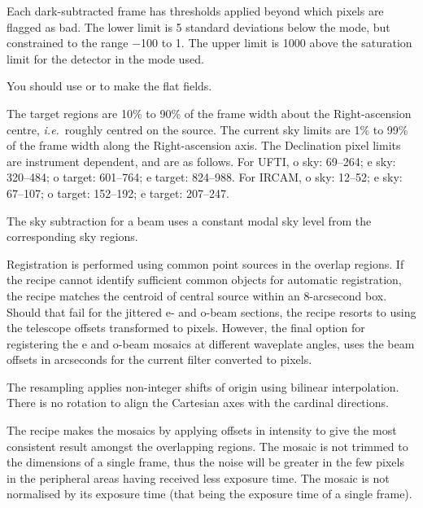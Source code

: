 \documentclass[twoside,11pt,nolof]{starlink}
\begin{document}
{{{         \sstitem
         Each dark-subtracted frame has thresholds applied beyond which
         pixels are flagged as bad.  The lower limit is 5 standard
         deviations below the mode, but constrained to the range $-$100 to 1.
         The upper limit is 1000 above the saturation limit for the detector
         in the mode used.

         \sstitem
         You should use  or
          to make the
         flat fields.

         \sstitem
         The target regions are 10\% to 90\% of the frame width about
         the Right-ascension centre, \emph{{i.e.}}\ roughly centred on the source.
         The current sky limits are 1\% to 99\% of the frame width along the
         Right-ascension axis.  The Declination pixel limits are instrument
         dependent, and are as follows.  For UFTI, o sky: 69--264;
         e sky: 320--484; o target: 601--764; e target: 824--988.  For
         IRCAM, o sky: 12--52; e sky: 67--107; o target: 152--192;
         e target: 207--247.

         \sstitem
         The sky subtraction for a beam uses a constant modal sky level
         from the corresponding sky regions.

         \sstitem
         Registration is performed using common point sources in the
         overlap regions.  If the recipe cannot identify sufficient common
         objects for automatic registration, the recipe matches the centroid
         of central source within an 8-arcsecond box.  Should that fail for
         the jittered e- and o-beam sections, the recipe resorts to using the
         telescope offsets transformed to pixels.  However, the final option
         for registering the e and o-beam mosaics at different waveplate
         angles, uses the beam offsets in arcseconds for the current filter
         converted to pixels.

         \sstitem
         The resampling applies non-integer shifts of origin using
         bilinear interpolation.  There is no rotation to align the
         Cartesian axes with the cardinal directions.

         \sstitem
         The recipe makes the mosaics by applying offsets in intensity
         to give the most consistent result amongst the overlapping regions.
         The mosaic is not trimmed to the dimensions of a single frame, thus
         the noise will be greater in the few pixels in the peripheral areas
         having received less exposure time.  The mosaic is not normalised by
         its exposure time (that being the exposure time of a single frame).

}}}
\end{document}
